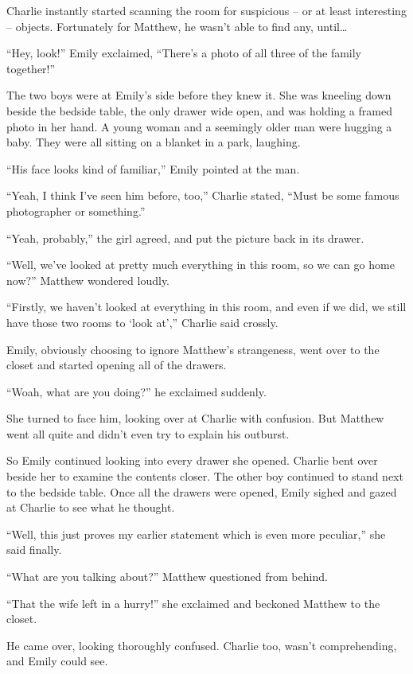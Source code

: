 Charlie instantly started scanning the room for suspicious – or at least interesting – objects. Fortunately for Matthew, he wasn’t able to find any, until…

“Hey, look!” Emily exclaimed, “There’s a photo of all three of the family together!”

The two boys were at Emily’s side before they knew it. She was kneeling down beside the bedside table, the only drawer wide open, and was holding a framed photo in her hand. A young woman and a seemingly older man were hugging a baby. They were all sitting on a blanket in a park, laughing.

“His face looks kind of familiar,” Emily pointed at the man.

“Yeah, I think I’ve seen him before, too,” Charlie stated, “Must be some famous photographer or something.”

“Yeah, probably,” the girl agreed, and put the picture back in its drawer.

“Well, we’ve looked at pretty much everything in this room, so we can go home now?” Matthew wondered loudly.

“Firstly, we haven’t looked at everything in this room, and even if we did, we still have those two rooms to ‘look at’,” Charlie said crossly.

Emily, obviously choosing to ignore Matthew’s strangeness, went over to the closet and started opening all of the drawers.

“Woah, what are you doing?” he exclaimed suddenly.

She turned to face him, looking over at Charlie with confusion. But Matthew went all quite and didn’t even try to explain his outburst.

So Emily continued looking into every drawer she opened. Charlie bent over beside her to examine the contents closer. The other boy continued to stand next to the bedside table. Once all the drawers were opened, Emily sighed and gazed at Charlie to see what he thought.

“Well, this just proves my earlier statement which is even more peculiar,” she said finally.

“What are you talking about?” Matthew questioned from behind.

“That the wife left in a hurry!” she exclaimed and beckoned Matthew to the closet.

He came over, looking thoroughly confused. Charlie too, wasn’t comprehending, and Emily could see.

